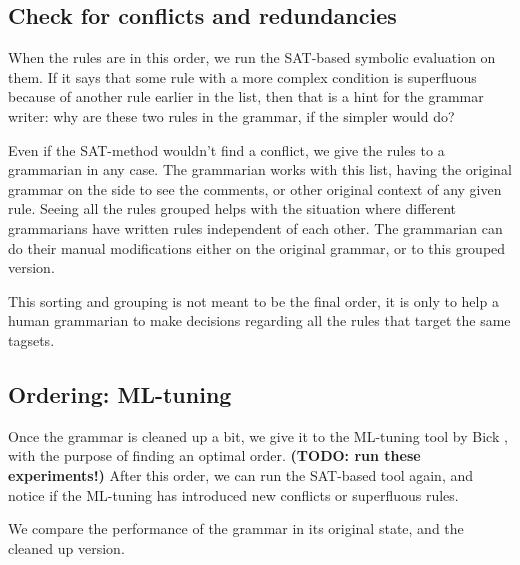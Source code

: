 \documentclass[11pt]{article}
\begin{document}
\subsection{Check for conflicts and redundancies}

When the rules are in this order, we run the SAT-based symbolic evaluation on them. If it says that some rule with a more complex condition is superfluous because of another rule earlier in the list, then that is a hint for the grammar writer: why are these two rules in the grammar, if the simpler would do?

Even if the SAT-method wouldn't find a conflict, we give the rules to a grammarian in any case. The grammarian works with this list, having the original grammar on the side to see the comments, or other original context of any given rule. Seeing all the rules grouped helps with the situation where different grammarians have written rules independent of each other. The grammarian can do their manual modifications either on the original grammar, or to this grouped version.

This sorting and grouping is not meant to be the final order, it is only to help a human grammarian to make decisions regarding all the rules that target the same tagsets.

\subsection{Ordering: ML-tuning}
Once the grammar is cleaned up a bit, we give it to the ML-tuning tool by Bick \cite{bick2013tuning}, with the purpose of finding an optimal order.
\textbf{(TODO: run these experiments!)}
After this order, we can run the SAT-based tool again, and notice if the ML-tuning has introduced new conflicts or superfluous rules.

We compare the performance of the grammar in its original state, and the cleaned up version. 






\end{document}
